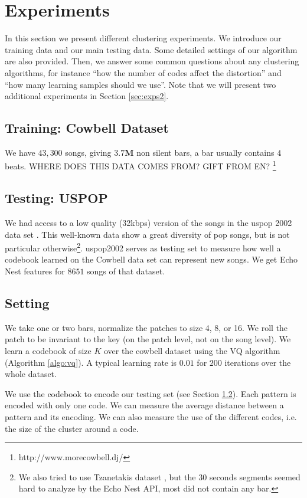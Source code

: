 \documentclass{article}
\begin{document}
\section{Experiments}\label{sec:experiments}
In this section we present different clustering experiments. We introduce
our training data and our main testing data. Some detailed settings
of our algorithm are also provided. Then, we answer some common questions
about any clustering algorithms, for instance 
``how the number of codes affect the distortion''
and ``how many learning samples should we use''.
Note that we will present two additional experiments in 
Section \ref{sec:exps2}.


\subsection{Training: Cowbell Dataset}\label{sec:traindata}
We have $43,300$ songs, giving  
$\mathbf{3.7}$\textbf{M} 
non silent bars, a bar usually 
contains $4$ beats. WHERE DOES THIS DATA COMES FROM? GIFT FROM EN?
\footnote{http://www.morecowbell.dj/}

\subsection{Testing: USPOP}\label{sec:testdata}
We had access to a low quality (32kbps) version of the songs in the uspop 2002 
data set \cite{uspop2002}.
This well-known data show a great diversity of pop songs, but is not particular
otherwise\footnote{We 
also tried to use Tzanetakis dataset \cite{Tzanetakis2002a}, but 
the $30$ seconds segments seemed hard to analyze by the Echo Nest API, most did
not contain any bar.}.
uspop2002 serves as testing set to measure how well a codebook learned on
the Cowbell data set can represent new songs. We get Echo Nest features
for $8651$ songs of that dataset.


\subsection{Setting}\label{ssec:setting}
We take one or two bars, normalize the patches to size 4, 8, or 16.
We roll the patch to be invariant to the key (on the patch level, not on
the song level). We learn a codebook of size $K$ over the cowbell dataset 
using the VQ algorithm (Algorithm \ref{algo:vq}). A typical learning rate 
is $0.01$ for $200$ iterations over the whole dataset.

We use the codebook to encode our testing set (see Section \ref{sec:testdata}).
Each pattern is encoded with only one code. We can measure the average
distance between a pattern and its encoding. We can also measure the use
of the different codes, i.e. the size of the cluster around a code.
\end{document}
